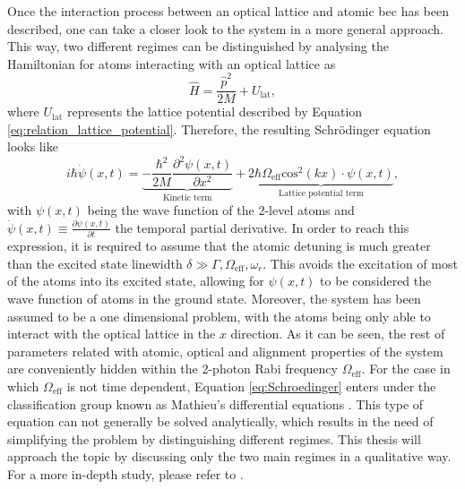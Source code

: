 Once the interaction process between an optical lattice and atomic \ac{bec} has been described, one can take a closer look to the system in a more general approach. This way, two different regimes can be distinguished by analysing the Hamiltonian for atoms interacting with an optical lattice as \cite{Mueller2008}
\begin{equation}
	\hat{H}= \frac{\hat{p}^2}{2M} + U_\text{lat},
\end{equation}
where $U_\text{lat}$ represents the lattice potential described by Equation \eqref{eq:relation_lattice_potential}. Therefore, the resulting Schr\"odinger equation looks like
\begin{equation}\label{eq:Schroedinger}
	i\hbar \dot\psi(x,t) = \underbrace{-\frac{\hbar^2}{2M}\frac{\partial^2 \psi(x,t)}{\partial x^2}}_{\text{Kinetic term}} + \underbrace{2\hbar \Omega_\text{eff} \text{cos}^2(kx)\cdot\psi(x,t)}_{\text{Lattice potential term}},
\end{equation}
with $\psi(x,t)$ being the wave function of the 2-level atoms and $\dot\psi(x,t) \equiv \frac{\partial \psi(x,t)}{\partial t}$ the temporal partial derivative. In order to reach this expression, it is required to assume that the atomic detuning is much greater than the excited state linewidth $\delta \gg \Gamma, \Omega_\text{eff}, \omega_r$. This avoids the excitation of most of the atoms into its excited state, allowing for $\psi(x,t)$ to be considered the wave function of atoms in the ground state. Moreover, the system has been assumed to be a one dimensional problem, with the atoms being only able to interact with the optical lattice in the $x$ direction. As it can be seen, the rest of parameters related with atomic, optical and alignment properties of the system are conveniently hidden within the 2-photon Rabi frequency $\Omega_\text{eff}$. For the case in which $\Omega_\text{eff}$ is not time dependent, Equation \eqref{eq:Schroedinger} enters under the classification group known as Mathieu's differential equations \cite{Mathieu1868}. This type of equation can not generally be solved analytically, which results in the need of simplifying the problem by distinguishing different regimes. This thesis will approach the topic by discussing only the two main regimes in a qualitative way. For a more in-depth study, please refer to \cite{Mueller2008, Meystre2001, Ovchinnikov1999, Kadau2011,Keller1999}.


